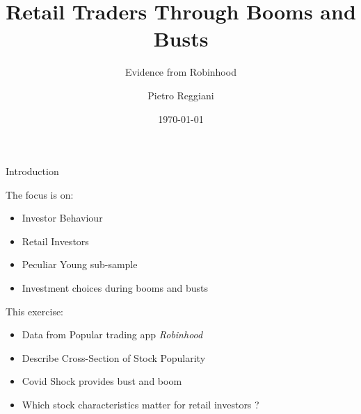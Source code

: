 \documentclass[10pt]{beamer}
\title[]{Retail Traders Through Booms and Busts} %
\subtitle{Evidence from Robinhood}
\author{Pietro Reggiani} %
\institute[] %
{PhD Second Year Paper Presentation}
\date{\today} %
\begin{document}
\begin{frame}
\titlepage %
\end{frame}



 
\begin{frame}{Introduction}

The focus is on:
\begin{itemize}[<+->]
\item Investor Behaviour 
\item Retail Investors
\item Peculiar Young sub-sample
\item Investment choices during booms and busts
\end{itemize}

\pause

\vspace{5mm}
This exercise:
\begin{itemize}[<+->]
\item Data from Popular trading app \textit{Robinhood}
\item Describe Cross-Section of Stock Popularity
\item Covid Shock provides bust and boom
\item Which stock characteristics matter for retail investors ?
\end{itemize}

\end{frame}
\end{document}
